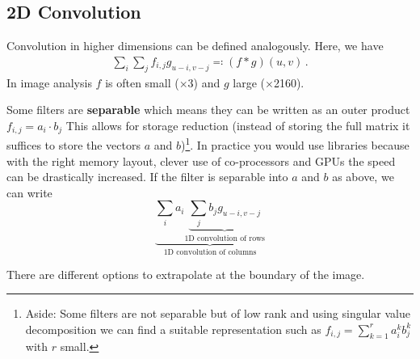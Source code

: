 \subsection*{2D Convolution}
Convolution in higher dimensions can be defined analogously. Here, we have
\begin{gather*}
  \sum_i \sum_j f_{i,j}g_{u-i,v-j} \eqqcolon (f \ast g)(u,v)\,.
\end{gather*}
In image analysis $f$ is often small ($\times$3) and $g$ large ($\times$2160).

Some filters are \textbf{separable} which means they can be written as an outer
product $f_{i,j} = a_i \cdot b_j$ This allows for storage reduction (instead of
storing the full matrix it suffices to store the vectors $a$ and
$b$)\footnote{Aside: Some filters are not separable but of low rank and using
  singular value decomposition we can find a suitable representation such as
  $f_{i,j} = \sum_{k=1}^r a_i^k b_j^k$ with $r$ small.}. In practice you would
use libraries because with the right memory layout, clever use of co-processors
and GPUs the speed can be drastically increased. If the filter is separable into
$a$ and $b$ as above, we can write
\begin{equation*}
  \underbrace{
    \sum_i a_i \underbrace{
      \sum_j b_j g_{u-i,v-j}
    }_{\text{1D convolution of rows}}
  }_{\text{1D convolution of columns}}
\end{equation*}

There are different options to extrapolate at the boundary of the image.


